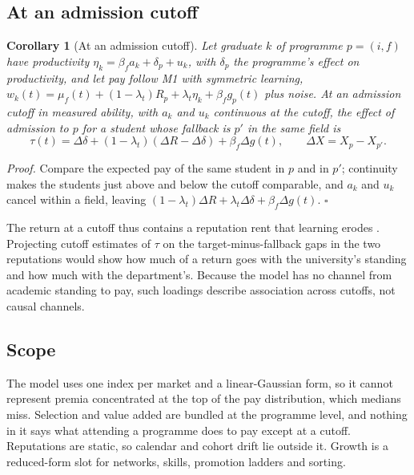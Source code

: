 \documentclass[11pt]{article}
\newtheorem{scor}{Corollary}
\newcommand{\qedsq}{\hfill$\square$}
\begin{document}
\subsection{At an admission cutoff}

\begin{scor}[At an admission cutoff]\label{cor:cutoff}
Let graduate $k$ of programme $p=(i,f)$ have productivity $\eta_k=\beta_fa_k+\delta_p+u_k$, with $\delta_p$ the
programme's effect on productivity, and let pay follow M1 with symmetric learning,
$w_k(t)=\mu_f(t)+(1-\lambda_t)R_p+\lambda_t\eta_k+\beta_fg_p(t)$ plus noise. At an admission cutoff in measured
ability, with $a_k$ and $u_k$ continuous at the cutoff, the effect of admission to $p$ for a student whose fallback
is $p'$ in the same field is
\[
\tau(t)=\Delta\delta+(1-\lambda_t)(\Delta R-\Delta\delta)+\beta_f\Delta g(t),\qquad \Delta X=X_p-X_{p'}.
\]
\end{scor}

\emph{Proof.} Compare the expected pay of the same student in $p$ and in $p'$; continuity makes the students just
above and below the cutoff comparable, and $a_k$ and $u_k$ cancel within a field, leaving
$(1-\lambda_t)\Delta R+\lambda_t\Delta\delta+\beta_f\Delta g(t)$. \qedsq

The return at a cutoff thus contains a reputation rent that learning erodes \citep{altonji2001employer,
macleod2017big}. Projecting cutoff estimates of $\tau$ on the target-minus-fallback gaps in the two reputations
\citep{kirkeboen2016field} would show how much of a return goes with the university's standing and how much with
the department's. Because the model has no channel from academic standing to pay, such loadings describe
association across cutoffs, not causal channels.

\subsection{Scope}

The model uses one index per market and a linear-Gaussian form, so it cannot represent premia concentrated at the
top of the pay distribution, which medians miss. Selection and value added are bundled at the programme level, and
nothing in it says what attending a programme does to pay except at a cutoff. Reputations are static, so calendar
and cohort drift lie outside it. Growth is a reduced-form slot for networks, skills, promotion ladders and sorting.

\end{document}
